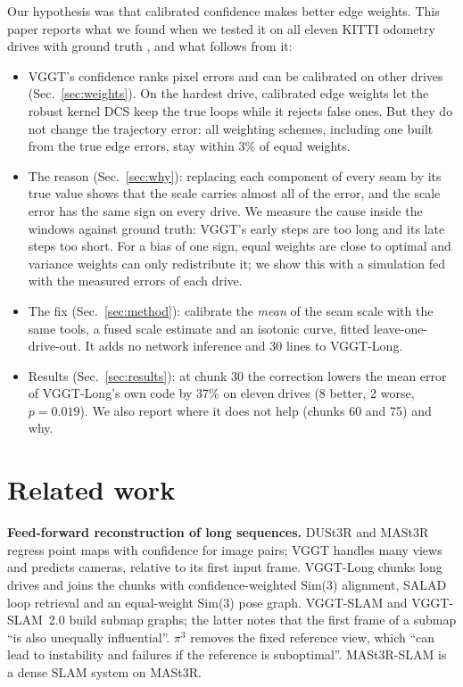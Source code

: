 \documentclass[conference]{IEEEtran}
\begin{document}
Our hypothesis was that calibrated confidence makes better edge weights. This paper reports what we found when we
tested it on all eleven KITTI odometry drives with ground truth \cite{kitti}, and what follows from it:
\begin{itemize}
\item VGGT's confidence ranks pixel errors and can be calibrated on other drives (Sec.~\ref{sec:weights}). On the hardest
drive, calibrated edge weights let the robust kernel DCS \cite{dcs} keep the true loops while it rejects false ones. But they do
not change the trajectory error: all weighting schemes, including one built from the true edge errors, stay within 3\%
of equal weights.
\item The reason (Sec.~\ref{sec:why}): replacing each component of every seam by its true value shows that the scale
carries almost all of the error, and the scale error has the same sign on every drive. We measure the cause inside the
windows against ground truth: VGGT's early steps are too long and its late steps too short. For a bias of one sign,
equal weights are close to optimal and variance weights can only redistribute it; we show this with a simulation fed
with the measured errors of each drive.
\item The fix (Sec.~\ref{sec:method}): calibrate the \emph{mean} of the seam scale with the same tools, a fused scale
estimate and an isotonic curve, fitted leave-one-drive-out. It adds no network inference and 30 lines to VGGT-Long.
\item Results (Sec.~\ref{sec:results}): at chunk 30 the correction lowers the mean error of VGGT-Long's own code by 37\%
on eleven drives (8 better, 2 worse, $p=0.019$). We also report where it does not help (chunks 60 and 75) and why.
\end{itemize}

\section{Related work}

\textbf{Feed-forward reconstruction of long sequences.} DUSt3R \cite{dust3r} and MASt3R \cite{mast3r} regress point maps
with confidence for image pairs; VGGT \cite{vggt} handles many views and predicts cameras, relative to its first input
frame. VGGT-Long \cite{vggtlong} chunks long drives and joins the chunks with confidence-weighted Sim(3) alignment, SALAD
\cite{salad} loop retrieval and an equal-weight Sim(3) pose graph. VGGT-SLAM \cite{vggtslam} and VGGT-SLAM~2.0
\cite{vggtslam2} build submap graphs; the latter notes that the first frame of a submap ``is also unequally
influential''. $\pi^3$ \cite{pi3} removes the fixed reference view, which ``can lead to instability and failures if the
reference is suboptimal''. MASt3R-SLAM \cite{mast3rslam} is a dense SLAM system on MASt3R.
\end{document}
